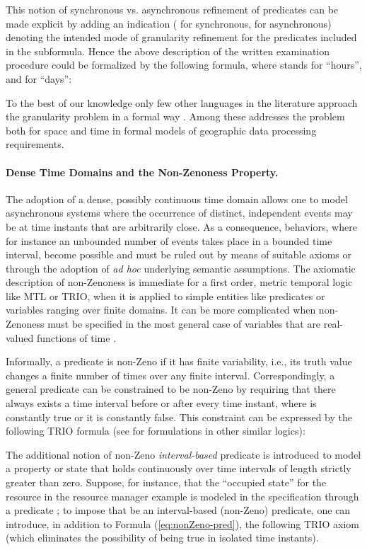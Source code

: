 This notion of synchronous vs. asynchronous refinement of predicates
can be made explicit by adding an indication ( for
synchronous,  for asynchronous) denoting the intended mode
of granularity refinement for the predicates included in the
subformula. Hence the above description of the written examination
procedure could be formalized by the following formula, where
 stands for ``hours'', and  for ``days'':



To the best of our knowledge only few other languages in the
literature approach the granularity problem in a formal way
\cite{BB06,Rom90}. Among these \cite{Rom90} addresses the problem both
for space and time in formal models of geographic data processing
requirements.




\paragraph{Dense Time Domains and the Non-Zenoness Property.}
The adoption of a dense, possibly continuous time domain allows 
one to model asynchronous systems where the occurrence of distinct, 
independent events may be at time instants that are arbitrarily 
close. As a consequence,  behaviors, where for instance an 
unbounded number of events takes place in a bounded time interval, 
become possible and must be ruled out by means of suitable axioms 
or through the adoption of \emph{ad hoc} underlying semantic assumptions. 
The axiomatic description of non-Zenoness is immediate for a 
first order, metric temporal logic like MTL or TRIO, when it is applied 
to simple entities like predicates or variables ranging over 
finite domains. It can be more complicated when non-Zenoness 
must be specified in the most general case of variables that 
are real-valued functions of time \cite{GM01}.

Informally, a predicate is non-Zeno if it has finite variability,
i.e., its truth value changes a finite number of times over any finite
interval. Correspondingly, a general predicate  can be
constrained to be non-Zeno by requiring that there always exists a
time interval before or after every time instant, where  is
constantly true or it is constantly false. This constraint can be
expressed by the following TRIO formula (see \cite{HR04,LWW07} for
formulations in other similar logics):


The additional notion of non-Zeno \emph{interval-based} predicate 
is introduced to model a property or state that holds continuously 
over time intervals of length strictly greater than zero. Suppose, 
for instance, that the ``occupied state'' for the resource in 
the resource manager example is modeled in the specification 
through a predicate ; to impose that  be an interval-based 
(non-Zeno) predicate, one can introduce, in addition to Formula (\ref{eq:nonZeno-pred}),
the following TRIO axiom (which eliminates the possibility 
of  being true in isolated time instants). 


